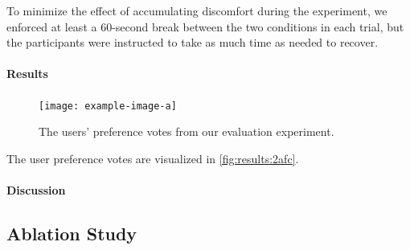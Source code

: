 To minimize the effect of accumulating discomfort during the experiment, we enforced at least a 60-second break between the two conditions in each trial, but the participants were instructed to take as much time as needed to recover.



\paragraph{Results}
\begin{figure}[htb]
    \centering
    \texttt{[image: example-image-a]}
    \caption{The users' preference votes from our evaluation experiment.}
    \label{fig:results:2afc}
\end{figure}
The user preference votes are visualized in \autoref{fig:results:2afc}.

\paragraph{Discussion}


\subsection{Ablation Study}


